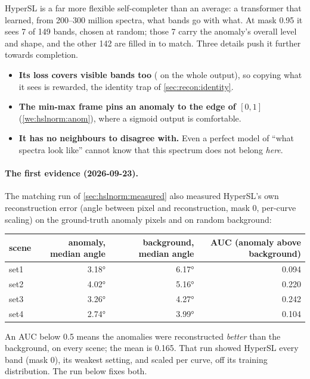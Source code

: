 HyperSL is a far more flexible self-completer than an average: a transformer that learned, from 200--300 million
spectra, what bands go with what. At mask 0.95 it sees 7 of 149 bands, chosen at random; those 7 carry the anomaly's
overall level and shape, and the other 142 are filled in to match. Three details push it further towards completion.
\begin{itemize}
\item \textbf{Its loss covers visible bands too} ( on the whole output), so copying what it sees is
rewarded, the identity trap of \cref{sec:recon:identity}.
\item \textbf{The min-max frame pins an anomaly to the edge of $[0,1]$} (\cref{we:hslnorm:anom}), where a sigmoid output is
comfortable.
\item \textbf{It has no neighbours to disagree with.} Even a perfect model of ``what spectra look like'' cannot know that
this spectrum does not belong \emph{here}.
\end{itemize}

\paragraph{The first evidence (2026-09-23).} The matching run of \cref{sec:hslnorm:measured} also measured HyperSL's own
reconstruction error (angle between pixel and reconstruction, mask 0, per-curve scaling) on the ground-truth anomaly pixels
and on random background:

\begin{center}\small
\begin{tabular}{@{}lrrr@{}}
\toprule
scene & anomaly, median angle & background, median angle & AUC (anomaly above background) \\
\midrule
set1 & 3.18° & 6.17° & 0.094 \\
set2 & 4.02° & 5.16° & 0.220 \\
set3 & 3.26° & 4.27° & 0.242 \\
set4 & 2.74° & 3.99° & 0.104 \\
\bottomrule
\end{tabular}
\end{center}
An AUC below 0.5 means the anomalies were reconstructed \emph{better} than the background, on every scene; the mean is
0.165\tagC{}. That run showed HyperSL every band (mask 0), its weakest setting,
and scaled per curve, off its training distribution. The run below fixes both.

